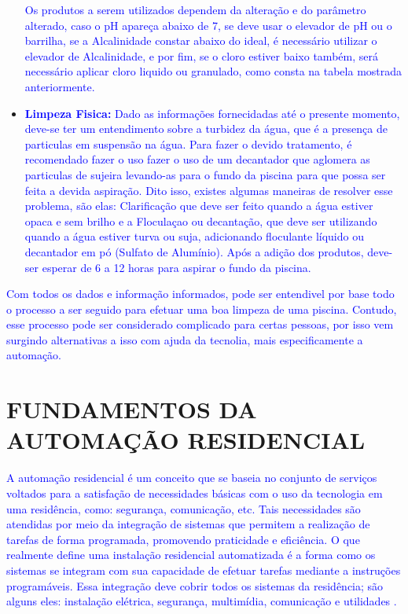 \begin{itemize}
            \textcolor{blue}{Os produtos a serem utilizados dependem da alteração e do parâmetro alterado, caso o pH apareça abaixo de 7, se deve usar o elevador de pH ou o barrilha, se a Alcalinidade constar abaixo do ideal, é necessário utilizar o elevador de Alcalinidade, e por fim, se o cloro estiver baixo também, será necessário aplicar cloro liquido ou granulado, como consta na tabela mostrada anteriormente.}


            \item \textbf{\textcolor{blue}{Limpeza Fisica:}} \textcolor{blue}{Dado as informações fornecidadas até o presente momento, deve-se ter um entendimento sobre a turbidez da água, que é a presença de particulas em suspensão na água. Para fazer o devido tratamento, é recomendado fazer o uso fazer o uso de um decantador que aglomera as particulas de sujeira levando-as para o fundo da piscina para que possa ser feita a devida aspiração. Dito isso, existes algumas maneiras de resolver esse problema, são elas: Clarificação que deve ser feito quando a água estiver opaca e sem brilho e a Floculaçao ou decantação, que deve ser utilizando quando a água estiver turva ou suja, adicionando floculante líquido ou decantador em pó (Sulfato de Alumínio). Após a adição dos produtos, deve-ser esperar de 6 a 12 horas para aspirar o fundo da piscina.}
            
        \end{itemize}

        \textcolor{blue}{Com todos os dados e informação informados, pode ser entendivel por base todo o processo a ser seguido para efetuar uma boa limpeza de uma piscina. Contudo, esse processo pode ser considerado complicado para certas pessoas, por isso vem surgindo alternativas a isso com ajuda da tecnolia, mais especificamente a automação.}
         
   
\section{FUNDAMENTOS DA AUTOMAÇÃO RESIDENCIAL}
    \textcolor{blue}{A automação residencial é um conceito que se baseia no conjunto de serviços voltados para a satisfação de necessidades básicas com o uso da tecnologia em uma residência, como: segurança, comunicação, etc. Tais necessidades são atendidas por meio da integração de sistemas que permitem a realização de tarefas de forma programada, promovendo praticidade e eficiência. O que realmente define uma instalação residencial automatizada é a forma como os sistemas se integram com sua capacidade de efetuar tarefas mediante a instruções programáveis. Essa integração deve cobrir todos os sistemas da residência; são alguns eles: instalação elétrica, segurança, multimídia, comunicação e utilidades \cite{automacaoResidencialCap1}.}

